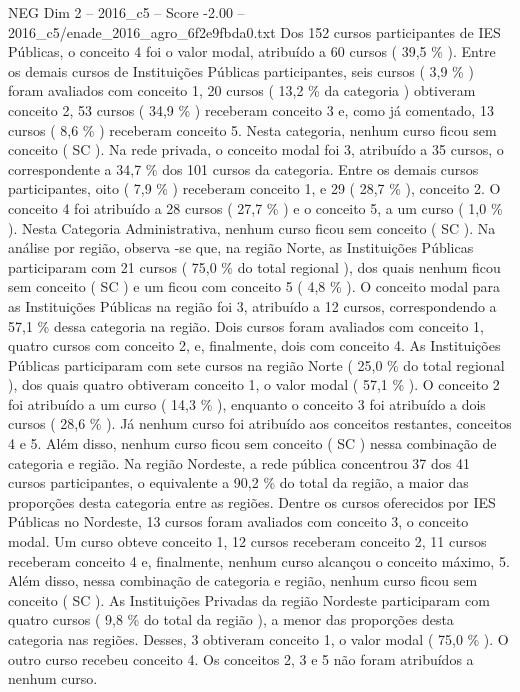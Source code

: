 \begin{textsample}{NEG Dim 2 – 2016\_c5 – Score -2.00 – 2016\_c5/enade\_2016\_agro\_6f2e9fbda0.txt}
Dos 152 cursos participantes de IES Públicas, o conceito 4 foi o valor modal, atribuído a 60 cursos ( 39,5 \% ).
Entre os demais cursos de Instituições Públicas participantes, seis cursos ( 3,9 \% ) foram avaliados com conceito 1, 20 cursos ( 13,2 \% da categoria ) obtiveram conceito 2, 53 cursos ( 34,9 \% ) receberam conceito 3 e, como já comentado, 13 cursos ( 8,6 \% ) receberam conceito 5.
Nesta categoria, nenhum curso ficou sem conceito ( SC ).
Na rede privada, o conceito modal foi 3, atribuído a 35 cursos, o correspondente a 34,7 \% dos 101 cursos da categoria.
Entre os demais cursos participantes, oito ( 7,9 \% ) receberam conceito 1, e 29 ( 28,7 \% ), conceito 2.
O conceito 4 foi atribuído a 28 cursos ( 27,7 \% ) e o conceito 5, a um curso ( 1,0 \% ).
Nesta Categoria Administrativa, nenhum curso ficou sem conceito ( SC ).
Na análise por região, observa -se que, na região Norte, as Instituições Públicas participaram com 21 cursos ( 75,0 \% do total regional ), dos quais nenhum ficou sem conceito ( SC ) e um ficou com conceito 5 ( 4,8 \% ).
O conceito modal para as Instituições Públicas na região foi 3, atribuído a 12 cursos, correspondendo a 57,1 \% dessa categoria na região.
Dois cursos foram avaliados com conceito 1, quatro cursos com conceito 2, e, finalmente, dois com conceito 4.
As Instituições Públicas participaram com sete cursos na região Norte ( 25,0 \% do total regional ), dos quais quatro obtiveram conceito 1, o valor modal ( 57,1 \% ).
O conceito 2 foi atribuído a um curso ( 14,3 \% ), enquanto o conceito 3 foi atribuído a dois cursos ( 28,6 \% ).
Já nenhum curso foi atribuído aos conceitos restantes, conceitos 4 e 5.
Além disso, nenhum curso ficou sem conceito ( SC ) nessa combinação de categoria e região.
Na região Nordeste, a rede pública concentrou 37 dos 41 cursos participantes, o equivalente a 90,2 \% do total da região, a maior das proporções desta categoria entre as regiões.
Dentre os cursos oferecidos por IES Públicas no Nordeste, 13 cursos foram avaliados com conceito 3, o conceito modal.
Um curso obteve conceito 1, 12 cursos receberam conceito 2, 11 cursos receberam conceito 4 e, finalmente, nenhum curso alcançou o conceito máximo, 5.
Além disso, nessa combinação de categoria e região, nenhum curso ficou sem conceito ( SC ).
As Instituições Privadas da região Nordeste participaram com quatro cursos ( 9,8 \% do total da região ), a menor das proporções desta categoria nas regiões.
Desses, 3 obtiveram conceito 1, o valor modal ( 75,0 \% ).
O outro curso recebeu conceito 4.
Os conceitos 2, 3 e 5 não foram atribuídos a nenhum curso.

\end{textsample}
